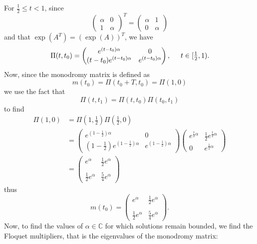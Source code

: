\documentclass{article}
\begin{document}
\begin{itemize}
    For $\tfrac{1}{2} \leq t < 1$, since 
    \[\begin{pmatrix}
        \alpha & 0\\
        1 & \alpha
    \end{pmatrix}^T = \begin{pmatrix}
        \alpha & 1\\
        0 & \alpha
    \end{pmatrix}\]
    and that $\exp(A^T) = (\exp(A))^T$, we have
    \[\Pi(t,t_0) = \begin{pmatrix}
        e^{(t - t_0)\alpha} & 0\\
        (t - t_0)e^{(t - t_0)\alpha} & e^{(t - t_0)\alpha}
    \end{pmatrix}, \hspace{0.5cm} t \in [\tfrac{1}{2},1).\]
    Now, since the monodromy matrix is defined as
    \[m(t_0) = \Pi(t_0 +T,t_0) = \Pi(1,0)\]
    we use the fact that 
    \[\Pi(t,t_1) = \Pi(t,t_0)\Pi(t_0,t_1)\]
    to find
    \begin{align*}
        \Pi(1,0) &= \Pi(1,\tfrac{1}{2})\Pi(\tfrac{1}{2},0)\\
        &= \begin{pmatrix}
            e^{(1 - \tfrac{1}{2})\alpha} & 0\\
            (1 - \tfrac{1}{2})e^{(1 - \tfrac{1}{2})\alpha} & e^{(1 - \tfrac{1}{2})\alpha}
        \end{pmatrix}\begin{pmatrix}
            e^{\tfrac{1}{2}\alpha} & \tfrac{1}{2}e^{\tfrac{1}{2}\alpha}\\
            0 & e^{\tfrac{1}{2}\alpha}
        \end{pmatrix}\\
        &= \begin{pmatrix}
            e^{\alpha} & \tfrac{1}{2}e^{\alpha}\\
            \\
            \tfrac{1}{2}e^{\alpha} & \tfrac{5}{4}e^{\alpha}
        \end{pmatrix}
    \end{align*}
    thus
    \[m(t_0) = \begin{pmatrix}
        e^{\alpha} & \tfrac{1}{2}e^{\alpha}\\
        \\
        \tfrac{1}{2}e^{\alpha} & \tfrac{5}{4}e^{\alpha}
    \end{pmatrix}.\]
    Now, to find the values of $\alpha \in \mathbb{C}$ for which solutions remain bounded, we find the Floquet multipliers, that is the eigenvalues of the monodromy matrix:

\end{itemize}
\end{document}
